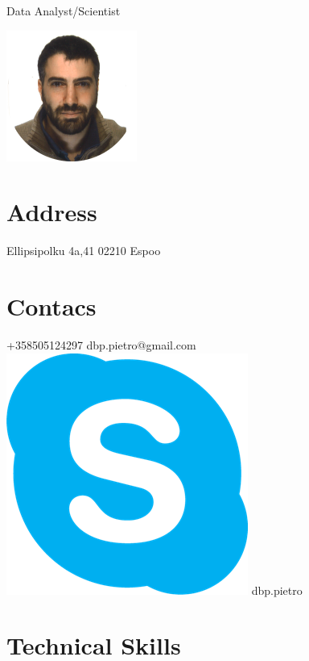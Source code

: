 \documentclass[]{friggeri-cv}
\begin{document}
      {Data Analyst/Scientist}
      

\begin{aside}
\includegraphics[scale=0.55]{img/foto.png}
  \section{Address}
    Ellipsipolku 4a,41
     02210 Espoo
    ~
  \section{Contacs}
    +358505124297
    dbp.pietro@gmail.com 
   \includegraphics[scale=0.05]{img/skype.png} dbp.pietro 
~ 
  \section{Technical Skills}
    ~

\end{aside}
\end{document}
